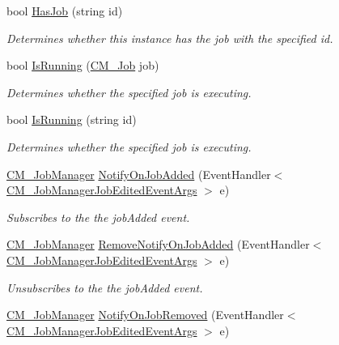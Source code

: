 \begin{DoxyCompactItemize}
bool \hyperlink{class_c_m___job_manager_a5b18579964f7e16836eb66465c4f6d09}{Has\+Job} (string id)
\begin{DoxyCompactList}\small\item\em Determines whether this instance has the job with the specified id. \end{DoxyCompactList}\item 
bool \hyperlink{class_c_m___job_manager_a12642c18c8755585be14a1566a000113}{Is\+Running} (\hyperlink{class_c_m___job}{C\+M\+\_\+\+Job} job)
\begin{DoxyCompactList}\small\item\em Determines whether the specified job is executing. \end{DoxyCompactList}\item 
bool \hyperlink{class_c_m___job_manager_a5a3b38ca378a94e24e39a111734d9791}{Is\+Running} (string id)
\begin{DoxyCompactList}\small\item\em Determines whether the specified job is executing. \end{DoxyCompactList}\item 
\hyperlink{class_c_m___job_manager}{C\+M\+\_\+\+Job\+Manager} \hyperlink{class_c_m___job_manager_a00224b541cd09c65942f7b23ee0b39c0}{Notify\+On\+Job\+Added} (Event\+Handler$<$ \hyperlink{class_c_m___job_manager_job_edited_event_args}{C\+M\+\_\+\+Job\+Manager\+Job\+Edited\+Event\+Args} $>$ e)
\begin{DoxyCompactList}\small\item\em Subscribes to the the job\+Added event. \end{DoxyCompactList}\item 
\hyperlink{class_c_m___job_manager}{C\+M\+\_\+\+Job\+Manager} \hyperlink{class_c_m___job_manager_acd3196581bb9e192e05274fca2e27cdc}{Remove\+Notify\+On\+Job\+Added} (Event\+Handler$<$ \hyperlink{class_c_m___job_manager_job_edited_event_args}{C\+M\+\_\+\+Job\+Manager\+Job\+Edited\+Event\+Args} $>$ e)
\begin{DoxyCompactList}\small\item\em Unsubscribes to the the job\+Added event. \end{DoxyCompactList}\item 
\hyperlink{class_c_m___job_manager}{C\+M\+\_\+\+Job\+Manager} \hyperlink{class_c_m___job_manager_afcf02b75d90366cecc51bc9d3dba518d}{Notify\+On\+Job\+Removed} (Event\+Handler$<$ \hyperlink{class_c_m___job_manager_job_edited_event_args}{C\+M\+\_\+\+Job\+Manager\+Job\+Edited\+Event\+Args} $>$ e)

\end{DoxyCompactItemize}
